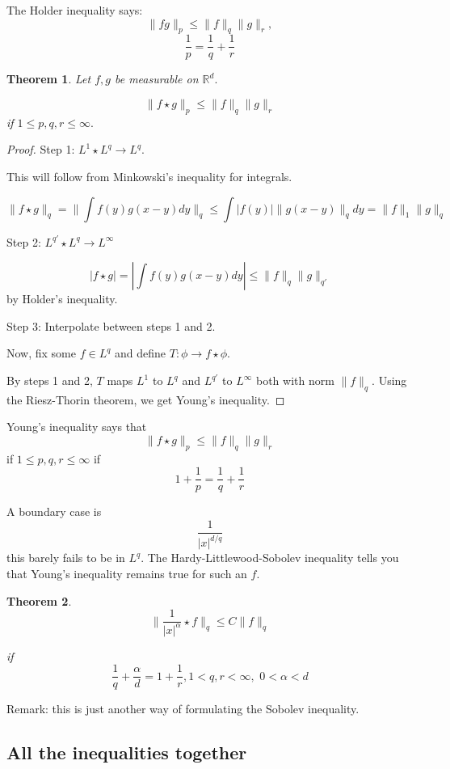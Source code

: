 \documentclass[11pt]{amsart}
\theoremstyle{plain}
\numberwithin{equation}{section}
\newtheorem{thm}{Theorem}[section]
\theoremstyle{remark}
\newcommand{\R}{\mathbb{R}}
\begin{document}
The Holder inequality says: $$\|fg \|_p \leq \| f\|_q \|g \|_{r},$$ $$\frac{1}{p} = \frac{1}{q}+\frac{1}{r}$$

\begin{thm}

Let $f,g$ be measurable on $\R^d.$

$$\| f\star g\|_{p} \leq \|f\|_{q} \|g\|_r$$ if $1\leq p,q,r \leq \infty.$

\end{thm}

\begin{proof}
Step 1: $L^1 \star L^q \rightarrow L^q.$

This will follow from Minkowski's inequality for integrals.

$$\|f\star g\|_{q} = \| \int f(y)g(x-y)dy \|_q \leq \int |f(y)|\| g(x-y) \|_q dy = \|f\|_1 \|g\|_q$$

Step 2: $L^{q'} \star L^q \rightarrow L^\infty$

$$|f\star g|= | \int f(y)g(x-y)dy | \leq \|f \|_q \|g\|_{q'} $$ by Holder's inequality.

Step 3: Interpolate between steps 1 and 2. 

Now, fix some $f\in L^q$ and define $T:\phi \rightarrow f\star \phi.$

By steps 1 and 2, $T$ maps $L^1$ to $L^q$ and $L^{q'} $ to $L^\infty$ both with norm $\|f\|_{q}.$ Using the Riesz-Thorin theorem, we get Young's inequality. 

\end{proof}

Young's inequality says that $$\| f\star g\|_{p} \leq \|f\|_{q} \|g\|_r$$ if $1\leq p,q,r \leq \infty$ if $$1+\frac{1}{p} = \frac{1}{q}+\frac{1}{r}$$

A boundary case is $$\frac{1}{|x|^{d/q}}$$ this barely fails to be in $L^q.$ The Hardy-Littlewood-Sobolev inequality tells you that Young's inequality remains true for such an $f.$


\begin{thm} 

$$\|\frac{1}{|x|^\alpha}\star f \|_q \leq C \|f\|_{q}$$

if $$\frac{1}{q} + \frac{\alpha}{d}= 1+ \frac{1}{r}, 1<q,r<\infty, \, \, 0<\alpha<d$$


\end{thm}

Remark: this is just another way of formulating the Sobolev inequality. 

\subsection{All the inequalities together}
\end{document}
